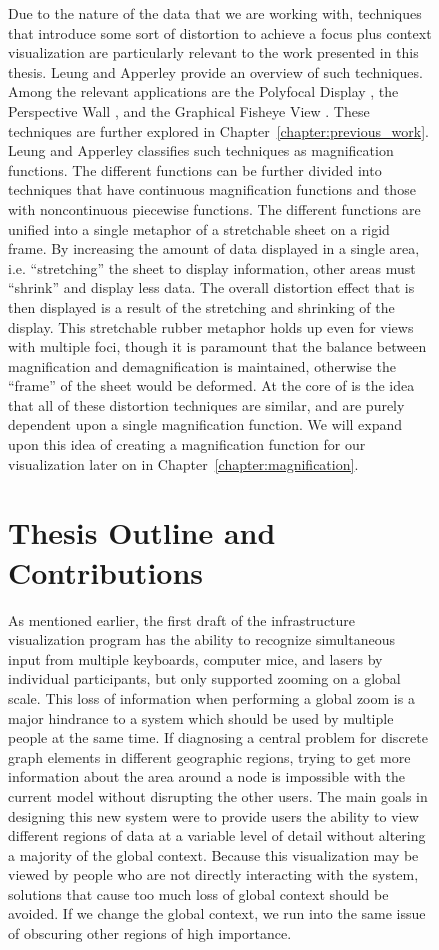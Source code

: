 \begin{figure}[htp]
{Due to the nature of the data that we are working with, techniques that introduce some sort of distortion to achieve a focus plus context visualization are particularly relevant to the work presented in this thesis. Leung and Apperley provide an overview of such techniques\cite{Leung1994}. Among the relevant applications are the Polyfocal Display \cite{Kadmon1978}, the Perspective Wall \cite{Mackinlay1991}, and the Graphical Fisheye View \cite{Sarkar1992}. These techniques are further explored in
Chapter~\ref{chapter:previous_work}. Leung and Apperley classifies such techniques as magnification functions. The different functions can be further divided into techniques that have continuous magnification functions and those with noncontinuous piecewise functions. The different functions are unified into a single metaphor of a stretchable sheet on a rigid frame. By increasing the amount of data displayed in a single area, i.e. ``stretching'' the sheet to display information, other areas must ``shrink'' and display less data. The overall distortion effect that is then displayed is a result of the stretching and shrinking of the display.
This stretchable rubber metaphor holds up even for views with multiple foci, though it is paramount that the balance between magnification and demagnification is maintained, otherwise the ``frame'' of the sheet would be deformed. At the core of \cite{Leung1994} is the idea that all of these distortion techniques are similar, and are purely dependent upon a single magnification function. We will expand upon this idea of creating a magnification function for our visualization later on in Chapter~\ref{chapter:magnification}.

\section{Thesis Outline and Contributions}
\label{section:intro_outline}
As mentioned earlier, the first draft of the infrastructure visualization program has the ability to
recognize simultaneous input from multiple keyboards, computer mice, and lasers by individual participants, but only supported zooming on a global scale. This loss of information when performing a global zoom is a major hindrance to a system which should be used by multiple people at the same time. If diagnosing a central problem for discrete graph elements in different geographic regions, trying to get more information about the area around a node is impossible with the
current model without disrupting the other users. The main goals in designing this new system were to provide users the ability to view different regions of data at a variable level of detail without altering a majority of the
global context. Because this visualization may be viewed by people who are not directly interacting with the system, solutions that cause too much loss of global context should be avoided. If we change the global context, we run into the same issue of obscuring other regions of high importance. 

}
\end{figure}
